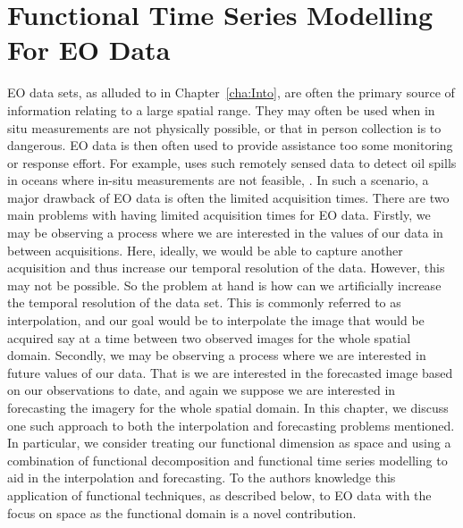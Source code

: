 
\chapter{Functional Time Series Modelling For EO Data \label{cha:ftsm}}  %



\ifpdf
    \graphicspath{{Chapter4/Figs/Raster/}{Chapter4/Figs/PDF/}{Chapter4/Figs/}}
\else
    \graphicspath{{Chapter4/Figs/Vector/}{Chapter4/Figs/}}
\fi

EO data sets, as alluded to in Chapter~\ref{cha:Into}, are often the primary source of information relating to a large spatial range.
They may often be used when in situ measurements are not physically possible, or that in person collection is to dangerous.
EO data is then often used to provide assistance too some monitoring or response effort.
For example, \citeauthor{singha_satellite_2013} uses such remotely sensed data to detect oil spills in oceans where in-situ measurements are not feasible, \citep{singha_satellite_2013}.
In such a scenario, a major drawback of EO data is often the limited acquisition times.
There are two main problems with having limited acquisition times for EO data.
Firstly, we may be observing a process where we are interested in the values of our data in between acquisitions.
Here, ideally, we would be able to capture another acquisition and thus increase our temporal resolution of the data.
However, this may not be possible.
So the problem at hand is how can we artificially increase the temporal resolution of the data set.
This is commonly referred to as interpolation, and our goal would be to interpolate the image that would be acquired say at a time between two observed images for the whole spatial domain.
Secondly, we may be observing a process where we are interested in future values of our data. That is we are interested in the forecasted image based on our observations to date, and again we suppose we are interested in forecasting the imagery for the whole spatial domain.
In this chapter, we discuss one such approach to both the interpolation and forecasting problems mentioned. In particular, we consider treating our functional dimension as space and using a combination of functional decomposition and functional time series modelling to aid in the interpolation and forecasting. To the authors knowledge this application of functional techniques, as described below, to EO data with the focus on space as the functional domain  is a novel contribution. 

